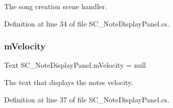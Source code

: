 The song creation scene handler. 



Definition at line 34 of file S\+C\+\_\+\+Note\+Display\+Panel.\+cs.

\mbox{\label{group___s_c___n_d_p_priv_var_ga4924aa3f63f171ed33f5f85d11a760c4}} 
\subsubsection{\texorpdfstring{m\+Velocity}{mVelocity}}
{\footnotesize\ttfamily Text S\+C\+\_\+\+Note\+Display\+Panel.\+m\+Velocity = null\hspace{0.3cm}{\ttfamily [private]}}



The text that displays the note\textquotesingle{}s velocity. 



Definition at line 37 of file S\+C\+\_\+\+Note\+Display\+Panel.\+cs.

